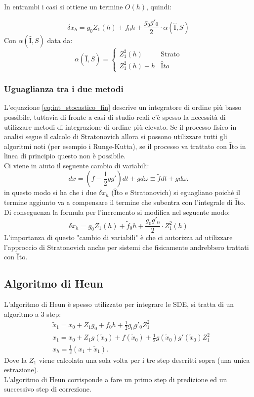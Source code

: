 In entrambi i casi si ottiene un termine $O(h)$, quindi:
\begin{redbox}{}
    \begin{equation}
    \delta x_h = 
    g_0Z_1(h) +
    f_0h + 
    \frac{g_0g'_0}{2}\cdot \alpha (\hat{\text{I}}, S) 
    \label{eq:int_stocastico_fin}
    \end{equation}
Con $\alpha (\hat{\text{I}}, S)$ data da:
\[
    \alpha (\hat{\text{I}}, S) = 
    \begin{cases}
	Z_1^2(h) & \text{Strato}\\
	Z_1^2(h) - h & \hat{\text{I}}to
    \end{cases}
\]    
\end{redbox}
\noindent
\subsubsection{Uguaglianza tra i due metodi}%
\label{subsub:Uguaglianza tra i due metodi}
L'equazione \ref{eq:int_stocastico_fin} descrive un integratore di ordine più basso possibile, tuttavia di fronte a casi di studio reali c'è spesso la necessità di utilizzare metodi di integrazione di ordine più elevato. Se il processo fisico in analisi segue il calcolo di Stratonovich allora si possono utilizzare tutti gli algoritmi noti (per esempio i Runge-Kutta), se il processo va trattato con $\hat{\text{I}}$to in linea di principio questo non è possibile.\\
Ci viene in aiuto il seguente cambio di variabili:
\[
    dx = \left(f-\frac{1}{2}gg'\right)dt + gd\omega \equiv \tilde{f} dt + g d\omega
.\] 
in questo modo si ha che i due $\delta x_h$ ($\hat{\text{I}}$to e Stratonovich) si eguagliano poiché il termine aggiunto va a compensare il termine che subentra con l'integrale di $\hat{\text{I}}$to. Di conseguenza la formula per l'incremento si modifica nel seguente modo:
\[
    \delta x_h = 
    g_0Z_1(h) +
    \tilde{f}_0h + 
    \frac{g_0g'_0}{2}\cdot Z_1^2(h)
\]
L'importanza di questo "cambio di variabili" è che ci autorizza ad utilizzare l'approccio di Stratonovich anche per sistemi che fisicamente andrebbero trattati con $\hat{\text{I}}$to. \\
\subsection{Algoritmo di Heun}%
\label{sub:Algoritmo di Heun}
L'algoritmo di Heun è spesso utilizzato per integrare le SDE, si tratta di un algoritmo a 3 step:
\[\begin{aligned}
    & \tilde{x}_1 = x_0 + Z_1g_0 + f_0 h  + \frac{1}{2}g_0g'_0 Z_1^2\\
    & x_1 = x_0 + Z_1 g(\tilde{x}_0) + f(\tilde{x}_0)  + \frac{1}{2}g(\tilde{x}_0) g'(\tilde{x}_0) Z_1^2\\
    & x_h = \frac{1}{2}\left(x_1+ \tilde{x}_1\right)
.\end{aligned}\]
Dove la $Z_1$ viene calcolata una sola volta per i tre step descritti sopra (una unica estrazione).\\
L'algoritmo di Heun corrisponde a fare un primo step di predizione ed un successivo step di correzione.
\clearpage
